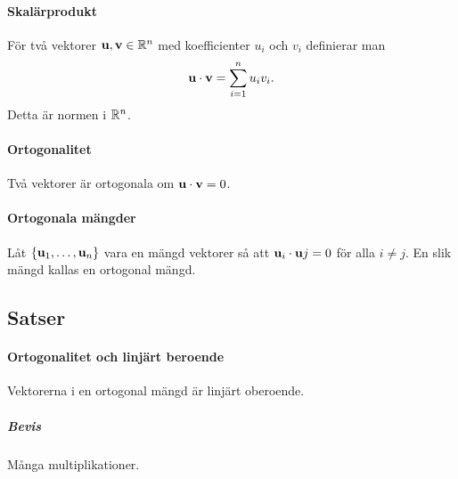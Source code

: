 \paragraph{Skalärprodukt}
För två vektorer $\vect{u}, \vect{v}\in\R^n$ med koefficienter $u_i$ och $v_i$ definierar man
\begin{align*}
	\vect{u}\cdot\vect{v} = \sum\limits_{i = 1}^n u_iv_i.
\end{align*}
Detta är normen i $\mathbb{R}^n$.

\paragraph{Ortogonalitet}
Två vektorer är ortogonala om $\vect{u}\cdot\vect{v} = 0$.

\paragraph{Ortogonala mängder}
Låt $\{\vect{u}_1, \dots, \vect{u}_n\}$ vara en mängd vektorer så att $\vect{u}_i\cdot\vect{u}j = 0$ för alla $i\neq j$. En slik mängd kallas en ortogonal mängd.

\subsection{Satser}

\paragraph{Ortogonalitet och linjärt beroende}
Vektorerna i en ortogonal mängd är linjärt oberoende.

\subparagraph{Bevis}
Många multiplikationer.